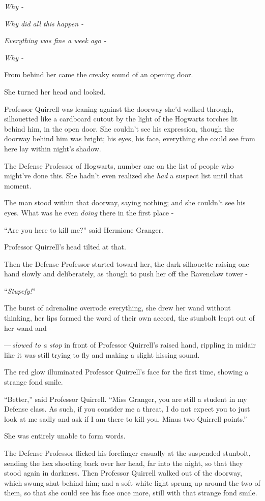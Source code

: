 \emph{Why -}

\emph{Why did all this happen -}

\emph{Everything was fine a week ago -}

\emph{Why -}

From behind her came the creaky sound of an opening door.

She turned her head and looked.

Professor Quirrell was leaning against the doorway she'd walked through, silhouetted like a cardboard cutout by the light of the Hogwarts torches lit behind him, in the open door. She couldn't see his expression, though the doorway behind him was bright; his eyes, his face, everything she could see from here lay within night's shadow.

The Defense Professor of Hogwarts, number one on the list of people who might've done this. She hadn't even realized she \emph{had} a suspect list until that moment.

The man stood within that doorway, saying nothing; and she couldn't see his eyes. What was he even \emph{doing} there in the first place -

``Are you here to kill me?'' said Hermione Granger.

Professor Quirrell's head tilted at that.

Then the Defense Professor started toward her, the dark silhouette raising one hand slowly and deliberately, as though to push her off the Ravenclaw tower -

``\emph{Stupefy!}''

The burst of adrenaline overrode everything, she drew her wand without thinking, her lips formed the word of their own accord, the stunbolt leapt out of her wand and -

---\,\emph{slowed to a stop} in front of Professor Quirrell's raised hand, rippling in midair like it was still trying to fly and making a slight hissing sound.

The red glow illuminated Professor Quirrell's face for the first time, showing a strange fond smile.

``Better,'' said Professor Quirrell. ``Miss Granger, you are still a student in my Defense class. As such, if you consider me a threat, I do not expect you to just look at me sadly and ask if I am there to kill you. Minus two Quirrell points.''

She was entirely unable to form words.

The Defense Professor flicked his forefinger casually at the suspended stunbolt, sending the hex shooting back over her head, far into the night, so that they stood again in darkness. Then Professor Quirrell walked out of the doorway, which swung shut behind him; and a soft white light sprung up around the two of them, so that she could see his face once more, still with that strange fond smile.

